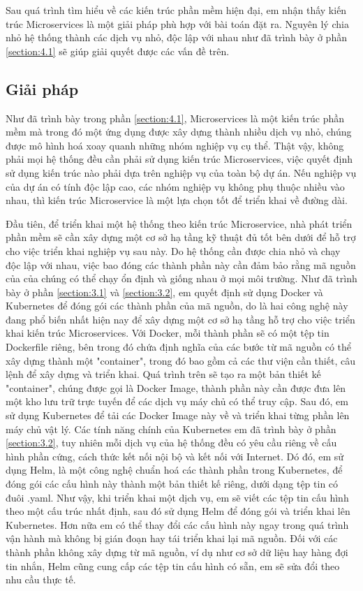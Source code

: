 \documentclass[../DoAn.tex]{subfiles}
\begin{document}
Sau quá trình tìm hiểu về các kiến trúc phần mềm hiện đại, em nhận thấy kiến trúc Microservices là một giải pháp phù hợp với bài toán đặt ra.
Nguyên lý chia nhỏ hệ thống thành các dịch vụ nhỏ, độc lập với nhau như đã trình bày ở phần \ref{section:4.1} sẽ giúp giải quyết được các vấn đề
trên.

\subsection{Giải pháp}
\label{subsection:5.1.2}

Như đã trình bày trong phần \ref{section:4.1}, Microservices là một kiến trúc phần mềm mà trong đó một ứng dụng được xây dựng thành nhiều dịch vụ nhỏ,
chúng được mô hình hoá xoay quanh những nhóm nghiệp vụ cụ thể. Thật vậy, không phải mọi hệ thống đều cần phải sử dụng kiến trúc Microservices,
việc quyết định sử dụng kiến trúc nào phải dựa trên nghiệp vụ của toàn bộ dự án. Nếu nghiệp vụ của dự án có tính độc lập cao, các nhóm nghiệp vụ
không phụ thuộc nhiều vào nhau, thì kiến trúc Microservice là một lựa chọn tốt để triển khai về đường dài.

Đầu tiên, để triển khai một hệ thống theo kiến trúc Microservice, nhà phát triển phần mềm sẽ cần xây dựng một cơ sở hạ tầng kỹ thuật đủ tốt bên dưới
để hỗ trợ cho việc triển khai nghiệp vụ sau này. Do hệ thống cần được chia nhỏ và chạy độc lập với nhau, việc bao đóng
các thành phần này cần đảm bảo rằng mã nguồn của của chúng có thể chạy ổn định và giống nhau ở mọi môi trường. Như đã trình bày ở phần \ref{section:3.1} và
\ref{section:3.2}, em quyết định sử dụng Docker và Kubernetes để đóng gói các thành phần của mã nguồn, do là hai công nghệ này đang phổ biến nhất hiện nay
để xây dựng một cơ sở hạ tầng hỗ trợ cho việc triển khai kiến trúc Microservices. Với Docker, mỗi thành phần sẽ có một tệp tin Dockerfile riêng,
bên trong đó chứa định nghĩa của các bước từ mã nguồn có thể xây dựng thành một "container", trong đó bao gồm cả các thư viện cần thiết,
câu lệnh để xây dựng và triển khai. Quá trình trên sẽ tạo ra một bản thiết kế "container", chúng được gọi là Docker Image, thành phần này cần được
đưa lên một kho lưu trữ trực tuyến để các dịch vụ máy chủ có thể truy cập. Sau đó, em sử dụng Kubernetes để tải các Docker Image này về
và triển khai từng phần lên máy chủ vật lý. Các tính năng chính của Kubernetes em đã trình bày ở phần \ref{section:3.2}, tuy nhiên mỗi dịch vụ của hệ thống đều có yêu cầu riêng
về cấu hình phần cứng, cách thức kết nối nội bộ và kết nối với Internet. Dó đó, em sử dụng Helm, là một công nghệ chuẩn hoá các thành phần trong Kubernetes,
để đóng gói các cấu hình này thành một bản thiết kế riêng, dưới dạng tệp tin có đuôi .yaml. Như vậy, khi triển khai một dịch vụ, em sẽ viết các tệp tin cấu hình theo một cấu trúc
nhất định, sau đó sử dụng Helm để đóng gói và triển khai lên Kubernetes. Hơn nữa em có thể thay đổi các cấu hình này ngay trong quá trình vận hành mà không bị gián đoạn hay tái triển khai
lại mã nguồn. Đối với các thành phần không xây dựng từ mã nguồn, ví dụ như cơ sở dữ liệu hay hàng đợi tin nhắn, Helm cũng cung cấp các tệp tin cấu hình có sẵn, em sẽ sửa đổi theo nhu cầu
thực tế.
\end{document}
